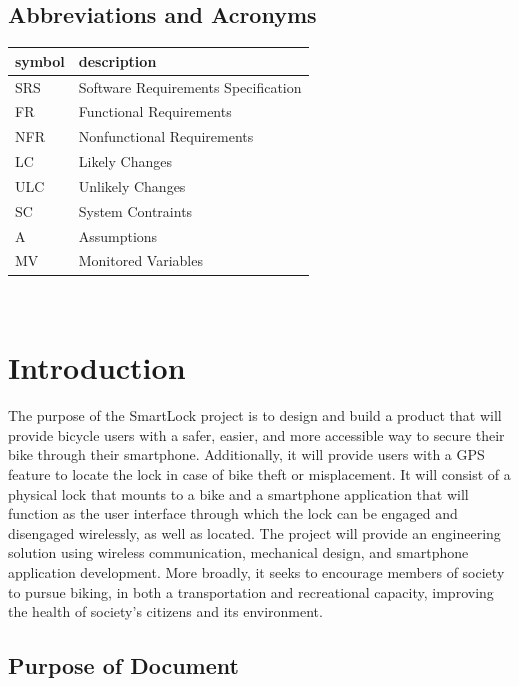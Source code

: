 \documentclass[12pt]{article}
\begin{document}
\subsection{Abbreviations and Acronyms}

\renewcommand{\arraystretch}{1.2}
\begin{tabular}{l l} 
  \toprule		
  \textbf{symbol} & \textbf{description}\\
  \midrule 
  SRS & Software Requirements Specification\\
  FR & Functional Requirements\\
  NFR & Nonfunctional Requirements\\
  LC & Likely Changes\\
  ULC & Unlikely Changes\\
  SC & System Contraints\\
  A & Assumptions\\
  MV & Monitored Variables\\
  \bottomrule
\end{tabular}\\





\section{Introduction}

The purpose of the SmartLock project is to design and build a product that will provide bicycle users with a safer, easier, and more accessible way to secure their bike through their smartphone. Additionally, it will provide users with a GPS feature to locate the lock in case of bike theft or misplacement.  It will consist of a physical lock that mounts to a bike and a smartphone application that will function as the user interface through which the lock can be engaged and disengaged wirelessly, as well as located. The project will provide an engineering solution using wireless communication, mechanical design, and smartphone application development. More broadly, it seeks to encourage members of society to pursue biking, in both a transportation and recreational capacity, improving the health of society’s citizens and its environment.  

\subsection{Purpose of Document}
\end{document}
